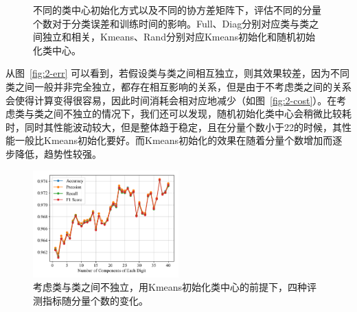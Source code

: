 \documentclass[UTF8]{ctexart}
\begin{document}
\begin{figure}[!h]
  \centering
  \quad  
  \caption{不同的类中心初始化方式以及不同的协方差矩阵下，评估不同的分量个数对于分类误差和训练时间的影响。Full、Diag分别对应类与类之间独立和相关，Kmeans、Rand分别对应Kmeans初始化和随机初始化类中心。}\label{fig:2-contrast}
\end{figure}

从图~\ref{fig:2-err} 可以看到，若假设类与类之间相互独立，则其效果较差，因为不同类之间一般并非完全独立，都存在相互影响的关系，但是由于不考虑类之间的关系会使得计算变得很容易，因此时间消耗会相对应地减少（如图~\ref{fig:2-cost}）。在考虑类与类之间不独立的情况下，我们还可以发现，随机初始化类中心会稍微比较耗时，同时其性能波动较大，但是整体趋于稳定，且在分量个数小于22的时候，其性能一般比Kmeans初始化要好。而Kmeans初始化的效果在随着分量个数增加而逐步降低，趋势性较强。

\begin{figure}[!h]
  \centering
  \includegraphics[width=0.5\textwidth]{figures/4metric.pdf}
  \caption{考虑类与类之间不独立，用Kmeans初始化类中心的前提下，四种评测指标随分量个数的变化。}\label{fig:2-4metrics}
\end{figure}
\end{document}
